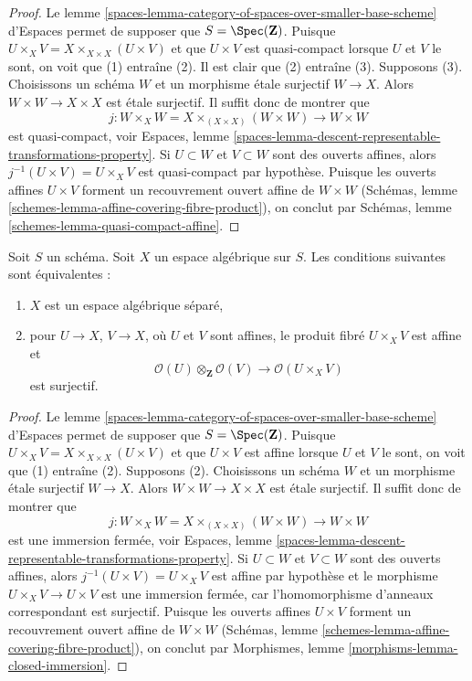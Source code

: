 \begin{proof}
Le lemme
\ref{spaces-lemma-category-of-spaces-over-smaller-base-scheme}
d'Espaces permet de supposer que $S = \Spec(\mathbf{Z})$.
Puisque $U \times_X V = X \times_{X \times X} (U \times V)$
et que $U \times V$ est quasi-compact lorsque $U$ et $V$ le sont,
on voit que (1) entraîne (2). Il est clair que (2) entraîne (3).
Supposons (3). Choisissons un schéma $W$ et un morphisme étale surjectif
$W \to X$. Alors $W \times W \to X \times X$ est étale surjectif.
Il suffit donc de montrer que
$$
j : W \times_X W = X \times_{(X \times X)} (W \times W) \to W \times W
$$
est quasi-compact, voir Espaces, lemme
\ref{spaces-lemma-descent-representable-transformations-property}.
Si $U \subset W$ et $V \subset W$ sont des ouverts affines, alors
$j^{-1}(U \times V) = U \times_X V$ est quasi-compact par hypothèse.
Puisque les ouverts affines $U \times V$ forment un recouvrement ouvert affine de
$W \times W$ (Schémas, lemme \ref{schemes-lemma-affine-covering-fibre-product}),
on conclut par
Schémas, lemme \ref{schemes-lemma-quasi-compact-affine}.
\end{proof}

\begin{lemma}
\label{lemma-characterize-separated}
Soit $S$ un schéma. Soit $X$ un espace algébrique sur $S$.
Les conditions suivantes sont équivalentes :
\begin{enumerate}
\item $X$ est un espace algébrique séparé,
\item pour $U \to X$, $V \to X$, où $U$ et $V$ sont affines,
le produit fibré $U \times_X V$ est affine et
$$
\mathcal{O}(U) \otimes_\mathbf{Z} \mathcal{O}(V)
\longrightarrow
\mathcal{O}(U \times_X V)
$$
est surjectif.
\end{enumerate}
\end{lemma}

\begin{proof}
Le lemme
\ref{spaces-lemma-category-of-spaces-over-smaller-base-scheme}
d'Espaces permet de supposer que $S = \Spec(\mathbf{Z})$.
Puisque $U \times_X V = X \times_{X \times X} (U \times V)$
et que $U \times V$ est affine lorsque $U$ et $V$ le sont,
on voit que (1) entraîne (2).
Supposons (2). Choisissons un schéma $W$ et un morphisme étale surjectif
$W \to X$. Alors $W \times W \to X \times X$ est étale surjectif.
Il suffit donc de montrer que
$$
j : W \times_X W = X \times_{(X \times X)} (W \times W) \to W \times W
$$
est une immersion fermée, voir Espaces, lemme
\ref{spaces-lemma-descent-representable-transformations-property}.
Si $U \subset W$ et $V \subset W$ sont des ouverts affines, alors
$j^{-1}(U \times V) = U \times_X V$ est affine par hypothèse
et le morphisme $U \times_X V \to U \times V$ est une immersion fermée,
car l'homomorphisme d'anneaux correspondant est surjectif.
Puisque les ouverts affines $U \times V$ forment un recouvrement ouvert affine
de $W \times W$
(Schémas, lemme \ref{schemes-lemma-affine-covering-fibre-product}),
on conclut par
Morphismes, lemme \ref{morphisms-lemma-closed-immersion}.
\end{proof}







